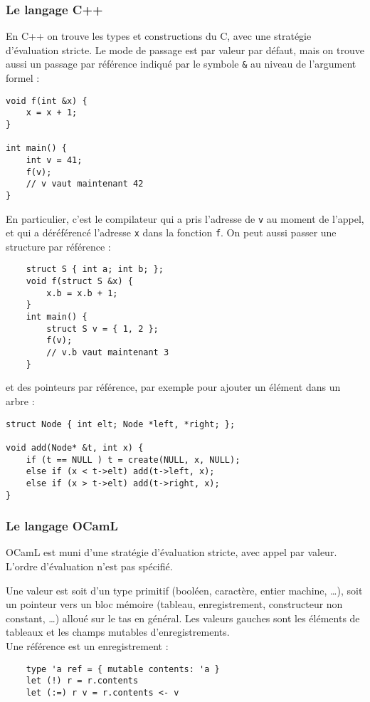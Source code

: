 \documentclass{cours}
\begin{document}
\subsubsection{Le langage C++}
En C++ on trouve les types et constructions du C, avec une stratégie d'évaluation stricte. Le mode de passage est par valeur par défaut, mais on trouve aussi un passage par référence indiqué par le symbole \texttt{\&} au niveau de l'argument formel :
\begin{verbatim}
void f(int &x) {
    x = x + 1;
}

int main() {
    int v = 41;
    f(v);
    // v vaut maintenant 42
}
\end{verbatim}
En particulier, c'est le compilateur qui a pris l'adresse de \texttt{v} au moment de l'appel, et qui a déréférencé l'adresse \texttt{x} dans la fonction \texttt{f}. On peut aussi passer une structure par référence : 
\begin{verbatim}
    struct S { int a; int b; };
    void f(struct S &x) {
        x.b = x.b + 1;
    }
    int main() {
        struct S v = { 1, 2 };
        f(v);
        // v.b vaut maintenant 3
    }
\end{verbatim}
et des pointeurs par référence, par exemple pour ajouter un élément dans un arbre :
\begin{verbatim}
struct Node { int elt; Node *left, *right; };

void add(Node* &t, int x) {
    if (t == NULL ) t = create(NULL, x, NULL);
    else if (x < t->elt) add(t->left, x);
    else if (x > t->elt) add(t->right, x);
}
\end{verbatim}

\subsubsection{Le langage OCamL}
OCamL est muni d'une stratégie d'évaluation stricte, avec appel par valeur. L'ordre d'évaluation n'est pas spécifié.

Une valeur est soit d'un type primitif (booléen, caractère, entier machine, \dots), soit un pointeur vers un bloc mémoire (tableau, enregistrement, constructeur non constant, \dots) alloué sur le tas en général. Les valeurs gauches sont les éléments de tableaux et les champs mutables d'enregistrements. \\

Une référence est un enregistrement : 
\begin{verbatim}
    type 'a ref = { mutable contents: 'a }
    let (!) r = r.contents
    let (:=) r v = r.contents <- v
\end{verbatim}
\end{document}
